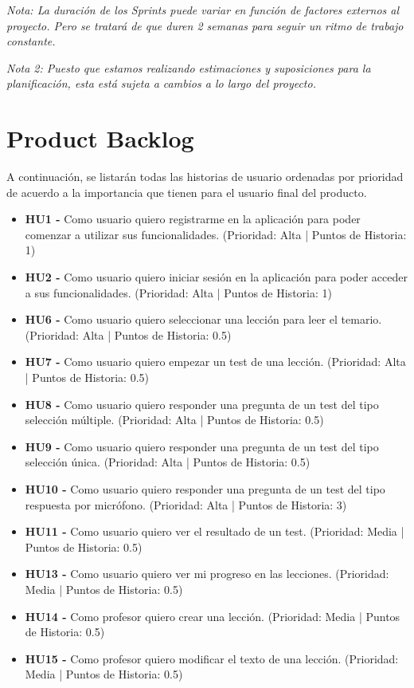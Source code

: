 \textit{Nota: La duración de los Sprints puede variar en función de factores externos al proyecto. Pero se tratará de que duren 2 semanas para seguir un ritmo de trabajo constante.}

\textit{Nota 2: Puesto que estamos realizando estimaciones y suposiciones para la planificación, esta está sujeta a cambios a lo largo del proyecto.}
\section{Product Backlog}
A continuación, se listarán todas las historias de usuario ordenadas por prioridad de acuerdo a la importancia que tienen para el usuario final del producto.
\begin{itemize}
    \item \textbf{HU1 - } Como usuario quiero registrarme en la aplicación para poder comenzar a utilizar sus funcionalidades. (Prioridad: Alta | Puntos de Historia: 1)
    \item \textbf{HU2 - } Como usuario quiero iniciar sesión en la aplicación para poder acceder a sus funcionalidades. (Prioridad: Alta | Puntos de Historia: 1)
    \item \textbf{HU6 - } Como usuario quiero seleccionar una lección para leer el temario. (Prioridad: Alta | Puntos de Historia: 0.5)
    \item \textbf{HU7 - } Como usuario quiero empezar un test de una lección. (Prioridad: Alta | Puntos de Historia: 0.5)
    \item \textbf{HU8 - } Como usuario quiero responder una pregunta de un test del tipo selección múltiple. (Prioridad: Alta | Puntos de Historia: 0.5)
    \item \textbf{HU9 - } Como usuario quiero responder una pregunta de un test del tipo selección única. (Prioridad: Alta | Puntos de Historia: 0.5)
    \item \textbf{HU10 - } Como usuario quiero responder una pregunta de un test del tipo respuesta por micrófono. (Prioridad: Alta | Puntos de Historia: 3)
    \item \textbf{HU11 - } Como usuario quiero ver el resultado de un test. (Prioridad: Media | Puntos de Historia: 0.5)
    \item \textbf{HU13 - } Como usuario quiero ver mi progreso en las lecciones. (Prioridad: Media | Puntos de Historia: 0.5)
    \item \textbf{HU14 - } Como profesor quiero crear una lección. (Prioridad: Media | Puntos de Historia: 0.5)
    \item \textbf{HU15 - } Como profesor quiero modificar el texto de una lección. (Prioridad: Media | Puntos de Historia: 0.5)

\end{itemize}
